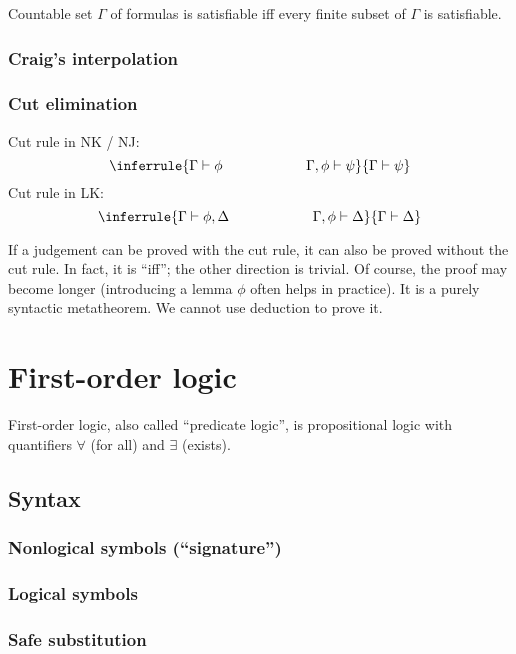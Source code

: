 {{Countable set $\Gamma$ of formulas is satisfiable iff every finite subset of $\Gamma$ is satisfiable.

\subsubsection{Craig's interpolation}

\subsubsection{Cut elimination}

Cut rule in NK / NJ:
$$\inferrule
{\Gamma\vdash\phi\qquad\qquad\qquad\Gamma,\phi\vdash\psi}
{\Gamma\vdash\psi}
$$
Cut rule in LK:
$$\inferrule
{\Gamma\vdash\phi,\Delta\qquad\qquad\qquad\Gamma,\phi\vdash\Delta}
{\Gamma\vdash\Delta}
$$

If a judgement can be proved with the cut rule, it can also be proved without the cut rule.
In fact, it is ``iff''; the other direction is trivial.
Of course, the proof may become longer (introducing a lemma $\phi$ often helps in practice).
It is a purely syntactic metatheorem. We cannot use deduction to prove it.

\section{First-order logic}

First-order logic, also called ``predicate logic'', is propositional logic with quantifiers $\forall$ (for all) and $\exists$ (exists).

\subsection{Syntax}

\subsubsection{Nonlogical symbols (``signature'')}

\subsubsection{Logical symbols}

\subsubsection{Safe substitution}

}} %
